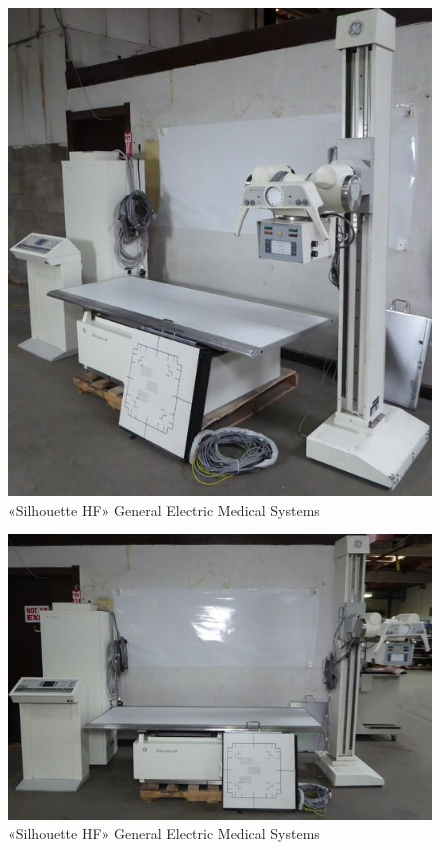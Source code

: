 \documentclass[11pt]{article}
\begin{document}
	\begin{figure}[H]
		\centering
		\includegraphics[width=\textwidth]{hf1}
		\caption{«Silhouette HF» General Electric Medical Systems}
		\label{fig:hf1}
	\end{figure}

	\begin{figure}[H]
	\centering
	\includegraphics[width=\textwidth]{hf2}
	\caption{«Silhouette HF» General Electric Medical Systems}
	\label{fig:hf2}
	\end{figure}
		
\end{document}
